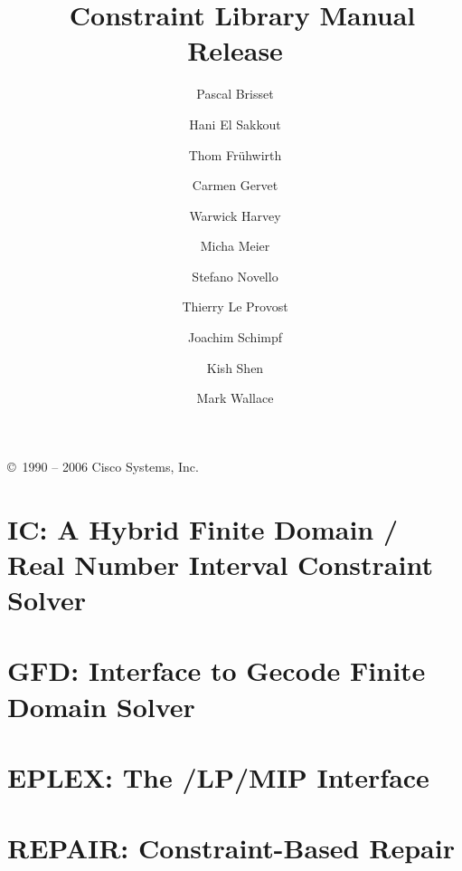 \documentclass[11pt,a4paper]{book}
\title{{\Huge \eclipse\ Constraint Library Manual}\\
	\vspace{1cm}
	Release \eclipseversion
    }
\author{
Pascal Brisset
\and Hani El Sakkout
\and Thom Fr\"{u}hwirth
\and Carmen Gervet
\and Warwick Harvey
\and Micha Meier
\and Stefano Novello
\and Thierry Le Provost
\and Joachim Schimpf
\and Kish Shen
\and Mark Wallace}
\begin{document}
\maketitle

\setcounter{page}{2}
\pagestyle{empty}

\vfill

\copyright\ 1990 -- 2006 Cisco Systems, Inc. 

\bigskip\bigskip\bigskip\bigskip\bigskip\bigskip

\cleardoublepage
\pagestyle{plain}

\tableofcontents

\cleardoublepage
{}





\chapter{IC: A Hybrid Finite Domain / Real Number Interval Constraint Solver}
\label{chapic}








\chapter{GFD: Interface to Gecode Finite Domain Solver}
\label{chapgfd}






\chapter{EPLEX: The \eclipse/LP/MIP Interface}
\label{chapeplex}


\chapter{REPAIR: Constraint-Based Repair}
\label{chaprepair}




\newpage
\printindex
\newpage


\end{document}
